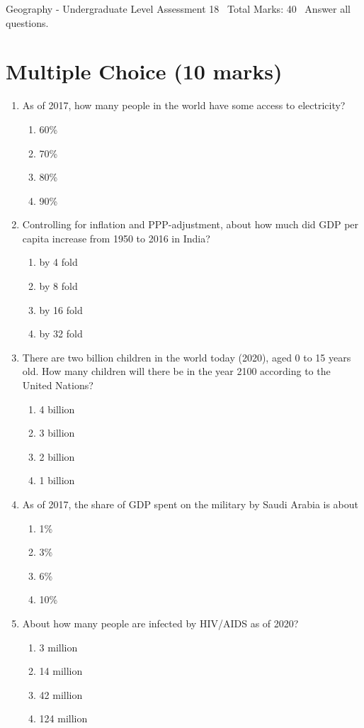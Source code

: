 \documentclass[12pt]{article}
\begin{document}
\begin{center}
Geography - Undergraduate Level Assessment 18 \
Total Marks: 40 \
Answer all questions.
\end{center}

\section*{Multiple Choice (10 marks)}
\begin{enumerate}[label=\arabic*.]
\item As of 2017, how many people in the world have some access to electricity?
\begin{enumerate}[label=(\alph*)]
    \item 60\%
    \item 70\%
    \item 80\%
    \item 90\%
\end{enumerate}
\item Controlling for inflation and PPP-adjustment, about how much did GDP per capita increase from 1950 to 2016 in India?
\begin{enumerate}[label=(\alph*)]
    \item by 4 fold
    \item by 8 fold
    \item by 16 fold
    \item by 32 fold
\end{enumerate}
\item There are two billion children in the world today (2020), aged 0 to 15 years old. How many children will there be in the year 2100 according to the United Nations?
\begin{enumerate}[label=(\alph*)]
    \item 4 billion
    \item 3 billion
    \item 2 billion
    \item 1 billion
\end{enumerate}
\item As of 2017, the share of GDP spent on the military by Saudi Arabia is about
\begin{enumerate}[label=(\alph*)]
    \item 1\%
    \item 3\%
    \item 6\%
    \item 10\%
\end{enumerate}
\item About how many people are infected by HIV/AIDS as of 2020?
\begin{enumerate}[label=(\alph*)]
    \item 3 million
    \item 14 million
    \item 42 million
    \item 124 million
\end{enumerate}
\end{enumerate}
\end{document}
